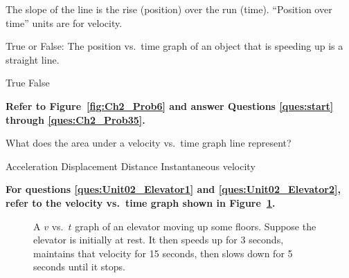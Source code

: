 \documentclass[]{exam}
\begin{document}
\begin{questions}
\begin{questions}
\begin{solution}
The slope of the line is the rise (position) over the run (time). ``Position over time'' units are for velocity.
\end{solution}


\question
True or False: The position vs.~time graph of an object that is speeding up is a straight line.

\begin{choices}
\choice True
\CorrectChoice False
\end{choices}



\begin{EnvUplevel}
\textbf{Refer to Figure~\ref{fig:Ch2_Prob6} and answer Questions \ref{ques:start} through \ref{ques:Ch2_Prob35}.}
\end{EnvUplevel}


\question
What does the area under a velocity vs.~time graph line represent?

\begin{choices}
\choice Acceleration
\CorrectChoice Displacement
\choice Distance
\choice Instantaneous velocity
\end{choices}

\begin{EnvUplevel}
\textbf{For questions \ref{ques:Unit02_Elevator1} and \ref{ques:Unit02_Elevator2}, refer to the velocity vs.~time graph shown in Figure~\ref{fig:Unit02_Fig2.20}.}
\end{EnvUplevel}

\begin{figure}[h!]
    \centering
    \caption{A $v$ vs.~$t$ graph of an elevator moving up some floors. Suppose the elevator is initially at rest. It then speeds up for 3 seconds, maintains that velocity for 15 seconds, then slows down for 5 seconds until it stops.}
    \label{fig:Unit02_Fig2.20}
\end{figure}


\end{questions}
\end{questions}
\end{document}
